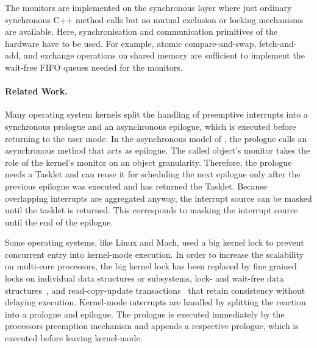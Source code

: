 The monitors are implemented on the synchronous layer where just ordinary synchronous C++ method calls but no mutual exclusion or locking mechanisms are available. Here, synchronisation and communication primitives of the hardware have to be used. For example, atomic compare-and-swap, fetch-and-add, and exchange operations on shared memory are sufficient to implement the wait-free FIFO queues needed for the monitors. 

\paragraph{Related Work.}
Many operating system kernels split the handling of preemptive interrupts into a synchronous prologue and an asynchronous epilogue, which is executed before returning to the user mode. In the asynchronous model of \mythos, the prologue calls an asynchronous method that acts as epilogue. The called object's monitor takes the role of the kernel's monitor on an object granularity. Therefore, the prologue needs a Tasklet and can reuse it for scheduling the next epilogue only after the previous epilogue was executed and has returned the Tasklet. Because overlapping interrupts are aggregated anyway, the interrupt source can be masked until the tasklet is returned. This corresponds to masking the interrupt source until the end of the epilogue.

Some operating systems, like Linux and Mach, used a big kernel lock to prevent concurrent entry into kernel-mode execution. In order to increase the scalability on multi-core processors, the big kernel lock has been replaced by fine grained locks on individual data structures or subsystems, lock- and wait-free data structures~\cite{Boyd-Wickizer:2010:ALS:1924943.1924944}, and read-copy-update transactions~\cite{McKenney2002} that retain consistency without delaying execution.
Kernel-mode interrupts are handled by splitting the reaction into a prologue and epilogue. The prologue is executed immediately by the processors preemption mechanism and appends a respective prologue, which is executed before leaving kernel-mode.    

